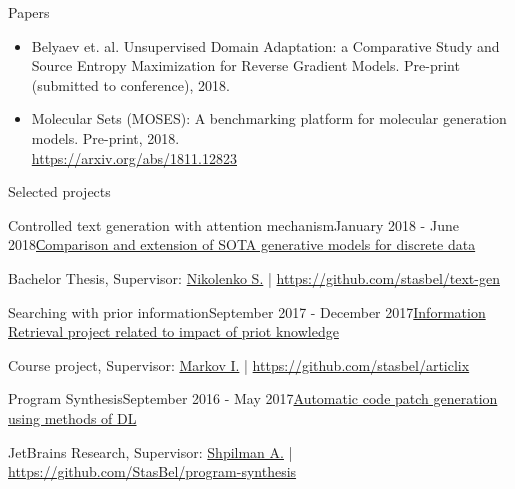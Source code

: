 \documentclass{resume} %
\begin{document}
\vspace{-1.3\baselineskip}
\begin{rSection}{Papers}

\begin{itemize}
    \item Belyaev et. al. Unsupervised Domain Adaptation: a Comparative Study and Source Entropy Maximization for Reverse Gradient Models. Pre-print (submitted to conference), 2018.
    \vspace{-0.5\baselineskip}
    \item Molecular Sets (MOSES): A benchmarking platform for molecular generation models. Pre-print, 2018. \\ \url{https://arxiv.org/abs/1811.12823}
\end{itemize}

\end{rSection}
\vspace{-0.9\baselineskip}
\begin{rSection}{Selected projects}

\begin{rSubsection}{Controlled text generation with attention mechanism}{January 2018 - June 2018}{\href{https://github.com/stasbel/bachelor-thesis}{Сomparison and extension of SOTA generative models for discrete data}}{}
\item[] Bachelor Thesis, Supervisor: \href{https://logic.pdmi.ras.ru/~sergey/}{Nikolenko S.} | \url{https://github.com/stasbel/text-gen}
\end{rSubsection}

\vspace{-0.9\baselineskip}
\begin{rSubsection}{Searching with prior information}{September 2017 - December 2017}{\href{https://github.com/stasbel/articlix/blob/master/misc/articlix-final-report.pdf}{Information Retrieval project related to impact of priot knowledge}}{}
\item[] Course project, Supervisor: \href{https://staff.fnwi.uva.nl/i.markov/}{Markov I.} | \url{https://github.com/stasbel/articlix}
\end{rSubsection}

\vspace{-0.9\baselineskip}
\begin{rSubsection}{Program Synthesis}{September 2016 - May 2017}{\href{https://docs.google.com/presentation/d/113EFcW8L7p8ickhfMoht8ivOomq2fRPizLtWSH9cSX4/pub?start=false&loop=false&delayms=3000}{Automatic code patch generation using methods of DL}}{}
\item[] JetBrains Research, Supervisor: \href{https://research.jetbrains.org/ru/researchers/ashpilman}{Shpilman A.} | \url{https://github.com/StasBel/program-synthesis}
\end{rSubsection}

\end{rSection}
\end{document}
